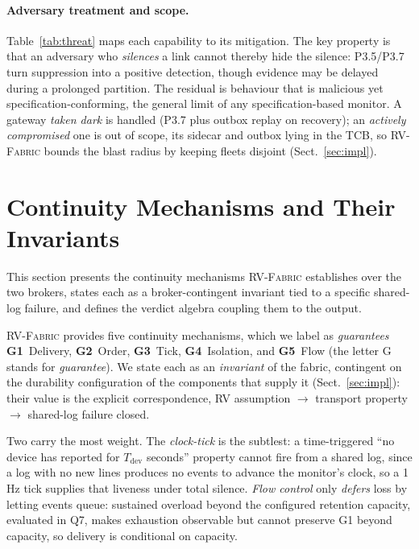 \documentclass[runningheads]{llncs}
\newcommand{\sys}{\textsc{RV-Fabric}\xspace}
\begin{document}
\paragraph{Adversary treatment and scope.}
Table~\ref{tab:threat} maps each capability to its mitigation. The key property is that an
adversary who \emph{silences} a link cannot thereby hide the silence: P3.5/P3.7 turn
suppression into a positive detection, though evidence may be delayed during a prolonged
partition. The residual is behaviour that is malicious yet specification-conforming, the
general limit of any specification-based monitor. A gateway \emph{taken dark} is handled
(P3.7 plus outbox replay on recovery); an \emph{actively compromised} one is out of scope,
its sidecar and outbox lying in the TCB, so \sys bounds the blast radius by keeping fleets
disjoint (Sect.~\ref{sec:impl}).

\section{Continuity Mechanisms and Their Invariants}
\label{sec:guarantees}
This section presents the continuity mechanisms \sys establishes over the two brokers,
states each as a broker-contingent invariant tied to a specific shared-log failure, and
defines the verdict algebra coupling them to the output.

\sys provides five continuity mechanisms, which we label as \emph{guarantees}
\textbf{G1}~Delivery, \textbf{G2}~Order, \textbf{G3}~Tick, \textbf{G4}~Isolation, and
\textbf{G5}~Flow (the letter G stands for \emph{guarantee}).
We state each as an \emph{invariant} of the fabric, contingent on the durability
configuration of the components that supply it (Sect.~\ref{sec:impl}): their value is
the explicit correspondence, RV assumption $\to$ transport property $\to$ shared-log
failure closed.

Two carry the most weight. The \emph{clock-tick} is the subtlest: a time-triggered ``no
device has reported for $T_{\mathrm{dev}}$ seconds'' property cannot fire from a shared
log, since a log with no new lines produces no events to advance the monitor's clock, so a
1\,Hz tick supplies that liveness under total silence. \emph{Flow control} only
\emph{defers} loss by letting events queue: sustained overload beyond the configured
retention capacity, evaluated in Q7, makes exhaustion observable but cannot preserve G1
beyond capacity, so delivery is conditional on capacity.
\end{document}
